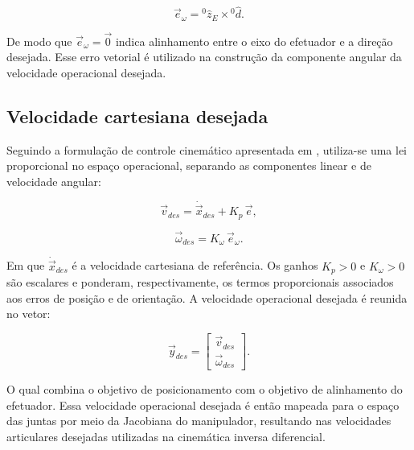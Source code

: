 \begin{equation}
\label{eq_erro_orientacao}
\vec{e}_{\omega}
=
{}^{0}\!\hat{z}_{E}
\times
{}^{0}\!\hat{d}.
\end{equation}

De modo que $\vec{e}_{\omega}=\vec{0}$ indica alinhamento entre o eixo do efetuador e a direção desejada.
Esse erro vetorial é utilizado na construção da componente angular da velocidade operacional desejada.


\subsection{Velocidade cartesiana desejada}

Seguindo a formulação de controle cinemático apresentada em \cite{sciavicco_siciliano2010}, utiliza-se uma lei proporcional no espaço operacional, separando as componentes linear e de velocidade angular:

\begin{equation}
\vec{v}_{des}
=
\dot{\vec{x}}_{des}
+
K_{p}\,\vec{e},
\label{eq_vd_desejada}
\end{equation}

\begin{equation}
\vec{\omega}_{des}
=
K_{\omega}\,\vec{e}_{\omega}.
\label{eq_omegad_desejada}
\end{equation}

Em que $\dot{\vec{x}}_{des}$ é a velocidade cartesiana de referência.
Os ganhos $K_{p}>0$ e $K_{\omega}>0$ são escalares e ponderam, respectivamente, os termos proporcionais associados aos erros de posição e de orientação.
A velocidade operacional desejada é reunida no vetor:

\begin{equation}
\label{eq_velocidade_operacional_desejada}
\vec{y}_{des}
=
\begin{bmatrix}
\vec{v}_{des} \\
\vec{\omega}_{des}
\end{bmatrix}.
\end{equation}

O qual combina o objetivo de posicionamento com o objetivo de alinhamento do efetuador.
Essa velocidade operacional desejada é então mapeada para o espaço das juntas por meio da Jacobiana do manipulador, resultando nas velocidades articulares desejadas utilizadas na cinemática inversa diferencial.


